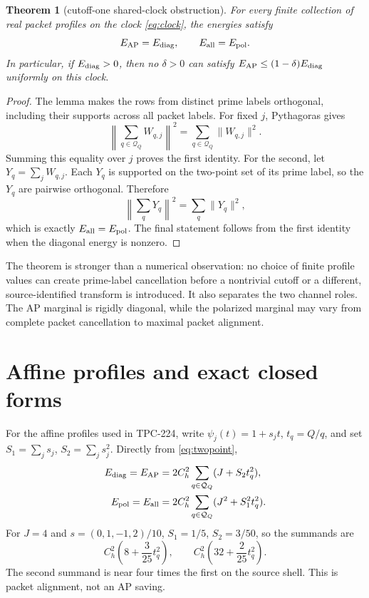 \documentclass[11pt]{article}
\newtheorem{theorem}{Theorem}
\begin{document}
\begin{theorem}[cutoff-one shared-clock obstruction]
For every finite collection of real packet profiles on the clock
\eqref{eq:clock}, the energies satisfy
\begin{equation}
 E_{\rm AP}=E_{\rm diag},\qquad E_{\rm all}=E_{\rm pol}.
 \label{eq:main}
\end{equation}
In particular, if \(E_{\rm diag}>0\), then no \(\delta>0\) can satisfy
\(E_{\rm AP}\leq(1-\delta)E_{\rm diag}\) uniformly on this clock.
\end{theorem}
\begin{proof}
The lemma makes the rows from distinct prime labels orthogonal, including
their supports across all packet labels.  For fixed \(j\), Pythagoras gives
\[
 \left\|\sum_{q\in\mathcal Q_Q}W_{q,j}\right\|^2
 =\sum_{q\in\mathcal Q_Q}\|W_{q,j}\|^2.
\]
Summing this equality over \(j\) proves the first identity.  For the second,
let \(Y_q=\sum_jW_{q,j}\).  Each \(Y_q\) is supported on the two-point set
of its prime label, so the \(Y_q\) are pairwise orthogonal.  Therefore
\[
 \left\|\sum_qY_q\right\|^2=\sum_q\|Y_q\|^2,
\]
which is exactly \(E_{\rm all}=E_{\rm pol}\).  The final statement follows
from the first identity when the diagonal energy is nonzero.
\end{proof}

The theorem is stronger than a numerical observation: no choice of finite
profile values can create prime-label cancellation before a nontrivial
cutoff or a different, source-identified transform is introduced.  It also
separates the two channel roles.  The AP marginal is rigidly diagonal, while
the polarized marginal may vary from complete packet cancellation to maximal
packet alignment.

\section{Affine profiles and exact closed forms}

For the affine profiles used in TPC-224, write
\(\psi_j(t)=1+s_jt\), \(t_q=Q/q\), and set
\(S_1=\sum_js_j\), \(S_2=\sum_js_j^2\).  Directly from
\eqref{eq:twopoint},
\begin{align}
 E_{\rm diag}=E_{\rm AP}
  &=2C_h^2\sum_{q\in\mathcal Q_Q}(J+S_2t_q^2),
 \label{eq:affined}\\
 E_{\rm pol}=E_{\rm all}
  &=2C_h^2\sum_{q\in\mathcal Q_Q}(J^2+S_1^2t_q^2).
 \label{eq:affinep}
\end{align}
For \(J=4\) and \(s=(0,1,-1,2)/10\),
\(S_1=1/5\), \(S_2=3/50\), so the summands are
\begin{equation}
 C_h^2\left(8+\frac{3}{25}t_q^2\right),\qquad
 C_h^2\left(32+\frac{2}{25}t_q^2\right).
 \label{eq:special}
\end{equation}
The second summand is near four times the first on the source shell.  This
is packet alignment, not an AP saving.
\end{document}
